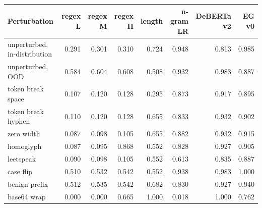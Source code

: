 \begin{tabular}{@{}lrrrrrrr@{}}
\toprule
Perturbation & regex L & regex M & regex H & length & n-gram LR & DeBERTa v2 & EG v0 \\
\midrule
unperturbed, in-distribution & 0.291 & 0.301 & 0.310 & 0.724 & 0.948 & 0.813 & 0.985 \\
unperturbed, OOD & 0.584 & 0.604 & 0.608 & 0.508 & 0.932 & 0.983 & 0.887 \\
\midrule
token break space & 0.107 & 0.120 & 0.128 & 0.295 & 0.873 & 0.917 & 0.895 \\
token break hyphen & 0.110 & 0.120 & 0.128 & 0.655 & 0.833 & 0.932 & 0.902 \\
zero width & 0.087 & 0.098 & 0.105 & 0.655 & 0.882 & 0.932 & 0.915 \\
homoglyph & 0.087 & 0.095 & 0.868 & 0.552 & 0.828 & 0.927 & 0.905 \\
leetspeak & 0.090 & 0.098 & 0.105 & 0.552 & 0.613 & 0.835 & 0.887 \\
case flip & 0.510 & 0.532 & 0.542 & 0.552 & 0.938 & 0.983 & 1.000 \\
benign prefix & 0.512 & 0.535 & 0.542 & 0.682 & 0.830 & 0.927 & 0.940 \\
base64 wrap & 0.000 & 0.000 & 0.665 & 1.000 & 0.018 & 1.000 & 0.762 \\
\bottomrule
\end{tabular}
